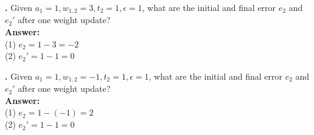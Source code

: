 \noindent
{}
{\bf \theLMSCounter.}  Given $a_1 = 1, w_{1,2} = 3, t_2 = 1 ,\epsilon = 1$, what are the initial and final error $e_2$ and $e_2'$ after one weight update? \\
{\bf Answer:}  \\
(1) $e_2 =  1 - 3  = -2 $ \\
(2) $e_2' = 1 - 1 = 0$
\bigskip

\noindent
{}
{\bf \theLMSCounter.}  Given $a_1 = 1, w_{1,2} = -1, t_2 = 1 ,\epsilon = 1$, what are the initial and final error $e_2$ and $e_2'$ after one weight update? \\
{\bf Answer:}  \\
(1) $e_2 =  1 - (-1)  = 2 $ \\
(2) $e_2' = 1 - 1 = 0$
\bigskip


